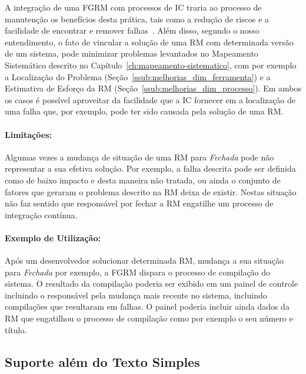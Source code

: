 A integração de uma FGRM com processos de IC traria ao processo de manutenção os
benefícios desta prática, tais como a redução de riscos e a facilidade de
encontrar e remover falhas~\cite{fowler2006continuous}.  Além disso, segundo o
nosso entendimento, o fato de vincular a solução de uma RM com determinada
versão de um sistema, pode minimizar problemas levantados no Mapeamento
Sistemático descrito no Capítulo~\ref{ch:mapeamento-sistematico}, com por
exemplo a Localização do Problema (Seção~\ref{ssub:melhorias_dim_ferramenta}) e
a Estimativa de Esforço da RM (Seção~\ref{ssub:melhorias_dim_processo}). Em
ambos os casos é possível aproveitar da facilidade que a IC fornecer em a
localização de uma falha que, por exemplo, pode ter sido causada pela solução de
uma RM\@.

\paragraph{Limitações:}
\label{par:limitacoes_s05}

Algumas vezes a mudança de situação de uma RM para \textit{Fechada} pode não
representar a sua efetiva solução. Por exemplo, a falha descrita pode ser
definida como de baixo impacto e desta maneira não tratada, ou ainda o conjunto
de fatores que geraram o problema descrito na RM deixa de existir. Nestas
situação não faz sentido que responsável por fechar a RM engatilhe um processo
de integração contínua.

\paragraph{Exemplo de Utilização:}
\label{par:exemplo_de_utilização_s05}

Após um desenvolvedor solucionar determinada RM, mudança a sua situação para
\textit{Fechada} por exemplo, a FGRM dispara o processo de compilação do
sistema. O resultado da compilação poderia ser exibido em um painel de controle
incluindo o responsável pela mudança mais recente no sistema, incluindo
compilações que resultaram em falhas. O painel poderia incluir ainda dados da RM
que engatilhou o processo de compilação como por exemplo o seu número e título.

\subsection{Suporte além do Texto Simples}
\label{sub:suporte_linguagem_marcacao}


